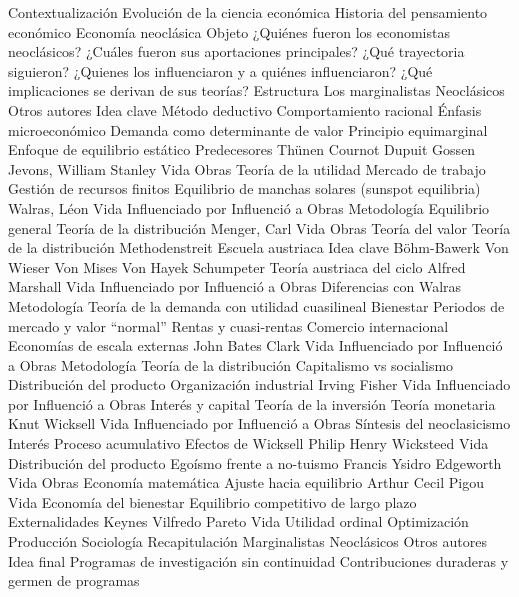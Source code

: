 \documentclass{nuevotema}
\begin{document}
\esquemacorto

\begin{esquema}[enumerate]
	\1[] 
		\2 Contextualización
			\3 Evolución de la ciencia económica
			\3 Historia del pensamiento económico
			\3 Economía neoclásica
		\2 Objeto
			\3 ¿Quiénes fueron los economistas neoclásicos?
			\3 ¿Cuáles fueron sus aportaciones principales?
			\3 ¿Qué trayectoria siguieron?
			\3 ¿Quienes los influenciaron y a quiénes influenciaron?
			\3 ¿Qué implicaciones se derivan de sus teorías?
		\2 Estructura
			\3 Los marginalistas
			\3 Neoclásicos
			\3 Otros autores
	\1 
		\2 Idea clave
			\3 Método deductivo
			\3 Comportamiento racional
			\3 Énfasis microeconómico
			\3 Demanda como determinante de valor
			\3 Principio equimarginal
			\3 Enfoque de equilibrio estático
		\2 Predecesores
			\3 Thünen
			\3 Cournot
			\3 Dupuit
			\3 Gossen
		\2 Jevons, William Stanley
			\3 Vida
			\3 Obras
			\3 Teoría de la utilidad
			\3 Mercado de trabajo
			\3 Gestión de recursos finitos
			\3 Equilibrio de manchas solares (sunspot equilibria)
		\2 Walras, Léon
			\3 Vida
			\3 Influenciado por
			\3 Influenció a
			\3 Obras
			\3 Metodología
			\3 Equilibrio general
			\3 Teoría de la distribución
		\2 Menger, Carl
			\3 Vida
			\3 Obras
			\3 Teoría del valor
			\3 Teoría de la distribución
			\3 Methodenstreit
		\2 Escuela austriaca
			\3 Idea clave
			\3 Böhm-Bawerk
			\3 Von Wieser
			\3 Von Mises
			\3 Von Hayek
			\3 Schumpeter
			\3 Teoría austriaca del ciclo
	\1 
		\2 Alfred Marshall
			\3 Vida
			\3 Influenciado por
			\3 Influenció a
			\3 Obras
			\3 Diferencias con Walras
			\3 Metodología
			\3 Teoría de la demanda con utilidad cuasilineal
			\3 Bienestar
			\3 Periodos de mercado y valor ``normal''
			\3 Rentas y cuasi-rentas
			\3 Comercio internacional
			\3 Economías de escala externas
		\2 John Bates Clark
			\3 Vida
			\3 Influenciado por
			\3 Influenció a
			\3 Obras
			\3 Metodología
			\3 Teoría de la distribución
			\3 Capitalismo vs socialismo
			\3 Distribución del producto
			\3 Organización industrial
		\2 Irving Fisher
			\3 Vida
			\3 Influenciado por
			\3 Influenció a
			\3 Obras
			\3 Interés y capital
			\3 Teoría de la inversión
			\3 Teoría monetaria
		\2 Knut Wicksell
			\3 Vida
			\3 Influenciado por
			\3 Influenció a
			\3 Obras
			\3 Síntesis del neoclasicismo
			\3 Interés
			\3 Proceso acumulativo
			\3 Efectos de Wicksell
	\1 
		\2 Philip Henry Wicksteed
			\3 Vida
			\3 Distribución del producto
			\3 Egoísmo frente a no-tuismo
		\2 Francis Ysidro Edgeworth
			\3 Vida
			\3 Obras
			\3 Economía matemática
			\3 Ajuste hacia equilibrio
		\2 Arthur Cecil Pigou
			\3 Vida
			\3 Economía del bienestar
			\3 Equilibrio competitivo de largo plazo
			\3 Externalidades
			\3 Keynes
		\2 Vilfredo Pareto
			\3 Vida
			\3 Utilidad ordinal
			\3 Optimización
			\3 Producción
			\3 Sociología
	\1[] 
		\2 Recapitulación
			\3 Marginalistas
			\3 Neoclásicos
			\3 Otros autores
		\2 Idea final
			\3 Programas de investigación sin continuidad
			\3 Contribuciones duraderas y germen de programas

\end{esquema}
\end{document}

